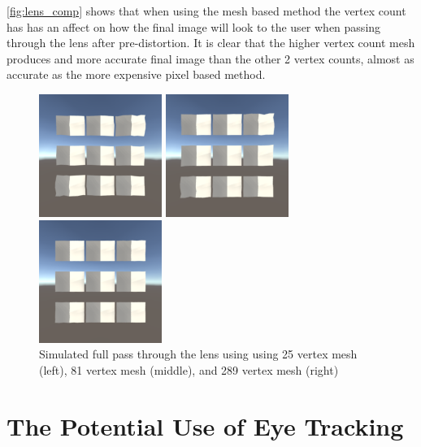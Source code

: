\documentclass[]{article}
\begin{document}
\autoref{fig:lens_comp} shows that when using the mesh based method the vertex count has has an affect on how the final image will look to the user when passing through the lens after pre-distortion. It is clear that the higher vertex count mesh produces and more accurate final image than the other 2 vertex counts, almost as accurate as the more expensive pixel based method.

\begin{figure}[H]
	\centering
	\begin{minipage}[H]{0.2\textwidth}
		\includegraphics[width=4cm]{Inv_Vec_32}
	\end{minipage}
	\hfill
	\begin{minipage}[H]{0.2\textwidth}
		\includegraphics[width=4cm]{Inv_Vec_128}
	\end{minipage}
	\hfill
	\begin{minipage}[H]{0.2\textwidth}
		\includegraphics[width=4cm]{Inv_Vec_512}
	\end{minipage}
	\caption{Simulated full pass through the lens using using 25 vertex mesh (left), 81 vertex mesh (middle), and 289 vertex mesh (right)}
	\label{fig:lens_comp}
\end{figure}
\section{The Potential Use of Eye Tracking}


\printbibliography
\end{document}

